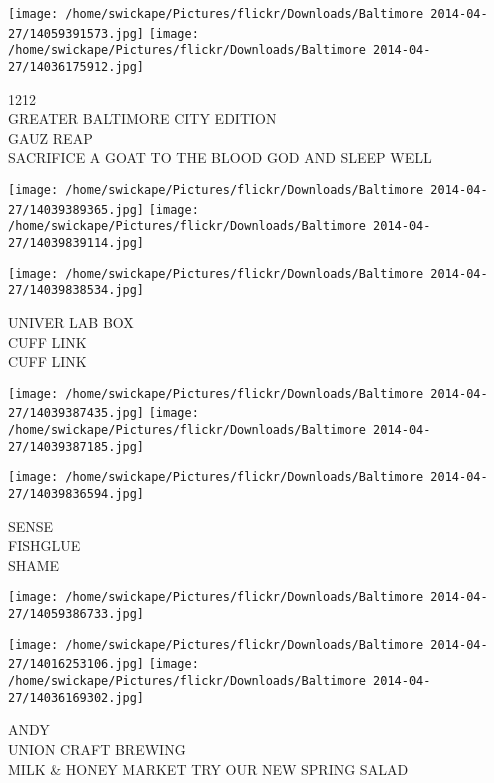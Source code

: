 \documentclass[10pt,letterpaper]{article}
\begin{document}
\texttt{[image: /home/swickape/Pictures/flickr/Downloads/Baltimore 2014-04-27/14059391573.jpg]}
\texttt{[image: /home/swickape/Pictures/flickr/Downloads/Baltimore 2014-04-27/14036175912.jpg]}

1212\\
GREATER BALTIMORE CITY EDITION\\
GAUZ REAP\\
SACRIFICE A GOAT TO THE BLOOD GOD AND SLEEP WELL\\
\pagebreak

\texttt{[image: /home/swickape/Pictures/flickr/Downloads/Baltimore 2014-04-27/14039389365.jpg]}
\texttt{[image: /home/swickape/Pictures/flickr/Downloads/Baltimore 2014-04-27/14039839114.jpg]}

\vspace{0.25in}
\texttt{[image: /home/swickape/Pictures/flickr/Downloads/Baltimore 2014-04-27/14039838534.jpg]}

UNIVER LAB BOX\\
CUFF LINK\\
CUFF LINK\\
\pagebreak

\texttt{[image: /home/swickape/Pictures/flickr/Downloads/Baltimore 2014-04-27/14039387435.jpg]}
\texttt{[image: /home/swickape/Pictures/flickr/Downloads/Baltimore 2014-04-27/14039387185.jpg]}

\texttt{[image: /home/swickape/Pictures/flickr/Downloads/Baltimore 2014-04-27/14039836594.jpg]}

SENSE\\
FISHGLUE\\
SHAME\\
\pagebreak

\texttt{[image: /home/swickape/Pictures/flickr/Downloads/Baltimore 2014-04-27/14059386733.jpg]}

\vspace{0.25in}
\texttt{[image: /home/swickape/Pictures/flickr/Downloads/Baltimore 2014-04-27/14016253106.jpg]}
\texttt{[image: /home/swickape/Pictures/flickr/Downloads/Baltimore 2014-04-27/14036169302.jpg]}

ANDY\\
UNION CRAFT BREWING\\
MILK \& HONEY MARKET TRY OUR NEW SPRING SALAD\\
\pagebreak
\end{document}
